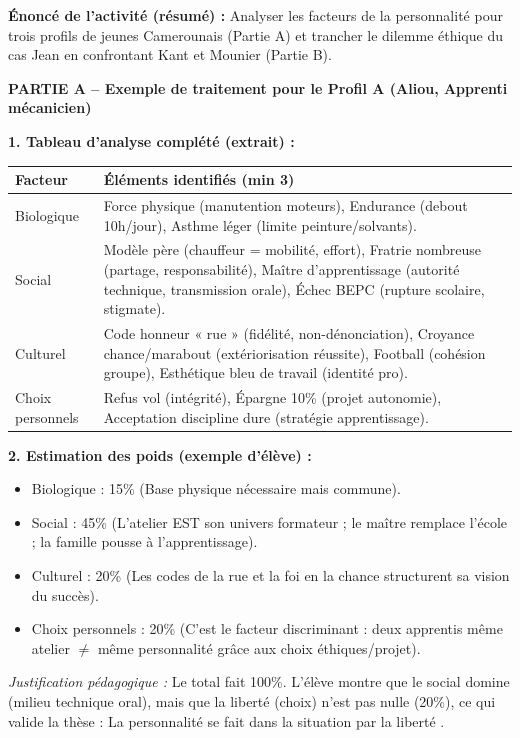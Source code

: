 \documentclass[11pt]{article}
\newcounter{popsec}
\newcounter{popsub}
\newcommand{\courssub}[1]{%
  \stepcounter{popsub}%
  \par\vspace{9pt}\noindent{\popxbold\fontsize{11.5}{13}\selectfont\color{popink}{\color{poporange}\thepopsec.\thepopsub}\hspace{6pt}#1}\par\nopagebreak\vspace{4pt}
}
\begin{document}
\courssub{Démarche et corrigé commenté}
\begin{exoresolu}
\textbf{Énoncé de l'activité (résumé) :} Analyser les facteurs de la personnalité pour trois profils de jeunes Camerounais (Partie A) et trancher le dilemme éthique du cas Jean en confrontant Kant et Mounier (Partie B).

\tcblower

\textbf{PARTIE A -- Exemple de traitement pour le Profil A (Aliou, Apprenti mécanicien)}

\textbf{1. Tableau d'analyse complété (extrait) :}
\begin{center}
\begin{tabularx}{\linewidth}{|l|X|}\hline
\textbf{Facteur} & \textbf{Éléments identifiés (min 3)} \\ \hline
Biologique & Force physique (manutention moteurs), Endurance (debout 10h/jour), Asthme léger (limite peinture/solvants). \\ \hline
Social & Modèle père (chauffeur = mobilité, effort), Fratrie nombreuse (partage, responsabilité), Maître d'apprentissage (autorité technique, transmission orale), Échec BEPC (rupture scolaire, stigmate). \\ \hline
Culturel & Code honneur « rue » (fidélité, non-dénonciation), Croyance chance/marabout (extériorisation réussite), Football (cohésion groupe), Esthétique bleu de travail (identité pro). \\ \hline
Choix personnels & Refus vol (intégrité), Épargne 10\% (projet autonomie), Acceptation discipline dure (stratégie apprentissage). \\ \hline
\end{tabularx}
\end{center}

\textbf{2. Estimation des poids (exemple d'élève) :}
\begin{itemize}
    \item Biologique : 15\% (Base physique nécessaire mais commune).
    \item Social : 45\% (L'atelier EST son univers formateur ; le maître remplace l'école ; la famille pousse à l'apprentissage).
    \item Culturel : 20\% (Les codes de la rue et la foi en la chance structurent sa vision du succès).
    \item Choix personnels : 20\% (C'est le facteur discriminant : deux apprentis même atelier $\neq$ même personnalité grâce aux choix éthiques/projet).
\end{itemize}
\textit{Justification pédagogique :} Le total fait 100\%. L'élève montre que le social domine (milieu technique oral), mais que la liberté (choix) n'est pas nulle (20\%), ce qui valide la thèse : \og{} La personnalité se fait dans la situation par la liberté \fg{}.


\end{exoresolu}
\end{document}
